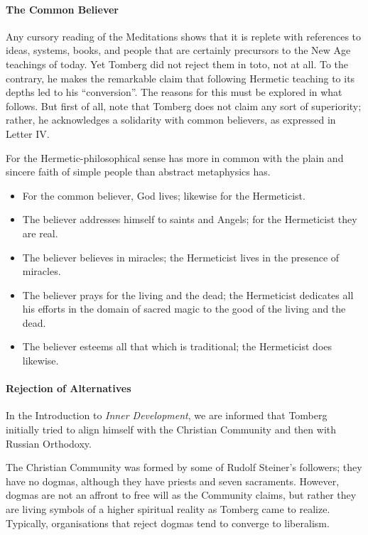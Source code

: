 \paragraph{The Common Believer}
Any cursory reading of the Meditations shows that it is replete with references to ideas, systems, books, and people
that are certainly precursors to the New Age teachings of today. Yet Tomberg did not reject them in toto, not at all.
To the contrary, he makes the remarkable claim that following Hermetic teaching to its depths led to his “conversion”.
The reasons for this must be explored in what follows. But first of all, note that Tomberg does not claim any sort of
superiority; rather, he acknowledges a solidarity with common believers, as expressed in Letter IV.

\begin{quotationx}
For the Hermetic-philosophical sense has more in common with the plain and sincere faith of simple people than abstract
metaphysics has.

\begin{itemize}
\item
For the common believer, God lives; likewise for the Hermeticist. 
\item 
The believer addresses himself to saints and Angels; for the Hermeticist they are real. 
\item
The believer believes in miracles; the Hermeticist lives in the presence of miracles. 
\item
The believer prays for the living and the dead; the Hermeticist dedicates all his efforts in the domain of sacred magic
to the good of the living and the dead. 
\item
The believer esteems all that which is traditional; the Hermeticist does likewise. 
\end{itemize}
\end{quotationx}

\paragraph{Rejection of Alternatives}
In the Introduction to \textit{Inner Development}, we are informed that Tomberg initially tried to align himself with the
Christian Community and then with Russian Orthodoxy.

The Christian Community was formed by some of Rudolf Steiner's followers; they have no dogmas, although they
have priests and seven sacraments. However, dogmas are not an affront to free will as the Community claims, but rather
they are living symbols of a higher spiritual reality as Tomberg came to realize. Typically, organisations that reject
dogmas tend to converge to liberalism.


